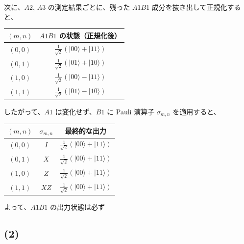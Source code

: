 \documentclass[11pt,a4paper]{ltjsarticle}
\begin{document}
次に、$A2$, $A3$ の測定結果ごとに、残った $A1B1$ 成分を抜き出して正規化すると、
\begin{center}
\begingroup
\renewcommand{\arraystretch}{1.4}
\setlength{\tabcolsep}{16pt}
\begin{tabular}{c c}
\hline
\((m,n)\) & $A1B1$ の状態（正規化後） \\
\hline
\((0,0)\) & $\frac{1}{\sqrt{2}}\left(\lvert 00 \rangle + \lvert 11 \rangle\right)$ \\
\((0,1)\) & $\frac{1}{\sqrt{2}}\left(\lvert 01 \rangle + \lvert 10 \rangle\right)$ \\
\((1,0)\) & $\frac{1}{\sqrt{2}}\left(\lvert 00 \rangle - \lvert 11 \rangle\right)$ \\
\((1,1)\) & $\frac{1}{\sqrt{2}}\left(\lvert 01 \rangle - \lvert 10 \rangle\right)$ \\
\hline
\end{tabular}
\endgroup
\end{center}

したがって、$A1$ は変化せず、$B1$ に Pauli 演算子 $\sigma_{m,n}$ を適用すると、
\begin{center}
\begingroup
\renewcommand{\arraystretch}{1.4}
\setlength{\tabcolsep}{14pt}
\begin{tabular}{c c c}
\hline
\((m,n)\) & $\sigma_{m,n}$ & 最終的な出力 \\
\hline
\((0,0)\) & $I$ & $\frac{1}{\sqrt{2}}\left(\lvert 00 \rangle + \lvert 11 \rangle\right)$ \\
\((0,1)\) & $X$ & $\frac{1}{\sqrt{2}}\left(\lvert 00 \rangle + \lvert 11 \rangle\right)$ \\
\((1,0)\) & $Z$ & $\frac{1}{\sqrt{2}}\left(\lvert 00 \rangle + \lvert 11 \rangle\right)$ \\
\((1,1)\) & $XZ$ & $\frac{1}{\sqrt{2}}\left(\lvert 00 \rangle + \lvert 11 \rangle\right)$ \\
\hline
\end{tabular}
\endgroup
\end{center}

よって、$A1B1$ の出力状態は必ず
\begin{center}
\end{center}

\subsection*{(2)}
\begin{center}
\end{center}
\end{document}
